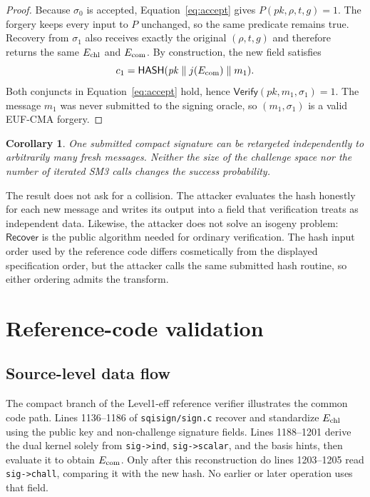 \documentclass[11pt,a4paper]{article}
\newtheorem{corollary}[theorem]{Corollary}
\newcommand{\Hash}{\mathsf{HASH}}
\newcommand{\Rec}{\mathsf{Recover}}
\newcommand{\Verify}{\mathsf{Verify}}
\begin{document}
\begin{proof}
Because $\sigma_0$ is accepted, Equation~\eqref{eq:accept} gives
$P(\mathit{pk},\rho,t,g)=1$.  The forgery keeps every input to $P$ unchanged, so the same
predicate remains true.  Recovery from $\sigma_1$ also receives exactly the original
$(\rho,t,g)$ and therefore returns the same $E_{\rm chl}$ and $E_{\rm com}$.  By construction,
the new field satisfies
\[
  c_1=\Hash(\mathit{pk}\parallel j(E_{\rm com})\parallel m_1).
\]
Both conjuncts in Equation~\eqref{eq:accept} hold, hence
$\Verify(\mathit{pk},m_1,\sigma_1)=1$.  The message $m_1$ was never submitted to the signing
oracle, so $(m_1,\sigma_1)$ is a valid EUF-CMA forgery.
\end{proof}

\begin{corollary}
One submitted compact signature can be retargeted independently to arbitrarily many fresh messages.
Neither the size of the challenge space nor the number of iterated SM3 calls changes the
success probability.
\end{corollary}

The result does not ask for a collision.  The attacker evaluates the hash honestly for each
new message and writes its output into a field that verification treats as independent data.
Likewise, the attacker does not solve an isogeny problem: $\Rec$ is the public algorithm needed
for ordinary verification.  The hash input order used by the reference code differs cosmetically
from the displayed specification order, but the attacker calls the same submitted hash routine,
so either ordering admits the transform.

\section{Reference-code validation}
\label{sec:experiment}

\subsection{Source-level data flow}

The compact branch of the Level1-eff reference verifier illustrates the common code path.
Lines 1136--1186 of \texttt{sqisign/sign.c} recover and standardize $E_{\rm chl}$ using the
public key and non-challenge signature fields.  Lines 1188--1201 derive the dual kernel solely
from \texttt{sig->ind}, \texttt{sig->scalar}, and the basis hints, then evaluate it to obtain
$E_{\rm com}$.  Only after this reconstruction do lines 1203--1205 read
\texttt{sig->chall}, comparing it with the new hash.  No earlier or later operation uses that
field.
\end{document}
